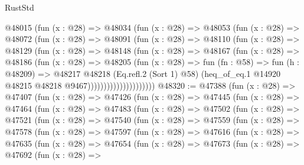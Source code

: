 \begin{lexlean}{RustStd}
\begin{coremodule}
                    @48015
                      (fun (x : @28) =>
                      @48034
                        (fun (x : @28) =>
                        @48053
                          (fun (x : @28) =>
                          @48072
                            (fun (x : @28) =>
                            @48091
                              (fun (x : @28) =>
                              @48110
                                (fun (x : @28) =>
                                @48129
                                  (fun (x : @28) =>
                                  @48148
                                    (fun (x : @28) =>
                                    @48167
                                      (fun (x : @28) =>
                                      @48186
                                        (fun (x : @28) =>
                                        @48205
                                          (fun (x : @28) =>
                                          fun (fn : @58) =>
                                          fun (h : @48209) =>
                                          @48217
                                            @48218
                                            (Eq.refl.{2} (Sort 1) @58)
                                            (heq_of_eq.{1}
                                              @14920
                                              @48215
                                              @48218
                                              @9467)))))))))))))))))))))
@48320 := @47388
    (fun (x : @28) =>
    @47407
      (fun (x : @28) =>
      @47426
        (fun (x : @28) =>
        @47445
          (fun (x : @28) =>
          @47464
            (fun (x : @28) =>
            @47483
              (fun (x : @28) =>
              @47502
                (fun (x : @28) =>
                @47521
                  (fun (x : @28) =>
                  @47540
                    (fun (x : @28) =>
                    @47559
                      (fun (x : @28) =>
                      @47578
                        (fun (x : @28) =>
                        @47597
                          (fun (x : @28) =>
                          @47616
                            (fun (x : @28) =>
                            @47635
                              (fun (x : @28) =>
                              @47654
                                (fun (x : @28) =>
                                @47673
                                  (fun (x : @28) =>
                                  @47692
                                    (fun (x : @28) =>

\end{coremodule}
\end{lexlean}
